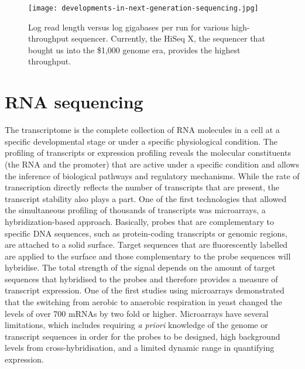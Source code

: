 \begin{figure}[!ht]
   \centering
   \texttt{[image: developments-in-next-generation-sequencing.jpg]}
   \caption[Developments in next generation sequencing]{Log read length versus log gigabases per run for various high-throughput sequencer\cite{Nederbragt2012}. Currently, the HiSeq X, the sequencer that bought us into the \$1,000 genome era, provides the highest throughput.}
   \label{fig:dev_next_gen}
\end{figure}

\section{RNA sequencing}

The transcriptome is the complete collection of RNA molecules in a cell at a specific developmental stage or under a specific physiological condition. The profiling of transcripts or expression profiling reveals the molecular constituents (the RNA and the promoter) that are active under a specific condition and allows the inference of biological pathways and regulatory mechanisms. While the rate of transcription directly reflects the number of transcripts that are present, the transcript stability also plays a part. One of the first technologies that allowed the simultaneous profiling of thousands of transcripts was microarrays\cite{pmid7569999}, a hybridization-based approach. Basically, probes that are complementary to specific DNA sequences, such as protein-coding transcripts or genomic regions, are attached to a solid surface. Target sequences that are fluorescently labelled are applied to the surface and those complementary to the probe sequences will hybridise. The total strength of the signal depends on the amount of target sequences that hybridised to the probes and therefore provides a measure of transcript expression. One of the first studies using microarrays demonstrated that the switching from aerobic to anaerobic respiration in yeast changed the levels of over 700 mRNAs by two fold or higher\cite{pmid9381177}. Microarrays have several limitations, which includes requiring \textit{a priori} knowledge of the genome or transcript sequences in order for the probes to be designed, high background levels from cross-hybridisation\cite{pmid16749918}, and a limited dynamic range in quantifying expression.

